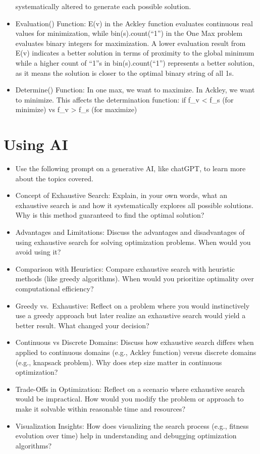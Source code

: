 \documentclass[
  letterpaper,
  DIV=11,
  numbers=noendperiod]{scrreprt}
\providecommand{\tightlist}{%
  \setlength{\itemsep}{0pt}\setlength{\parskip}{0pt}}\usepackage{longtable,booktabs,array}
\begin{document}
\begin{itemize}
  systematically altered to generate each possible solution.
\item
  Evaluation() Function: E(v) in the Ackley function evaluates
  continuous real values for minimization, while bin(s).count(``1'') in
  the One Max problem evaluates binary integers for maximization. A
  lower evaluation result from E(v) indicates a better solution in terms
  of proximity to the global minimum while a higher count of ``1''s in
  bin(s).count(``1'') represents a better solution, as it means the
  solution is closer to the optimal binary string of all 1s.
\item
  Determine() Function: In one max, we want to maximize. In Ackley, we
  want to minimize. This affects the determination function: if f\_v
  \textless{} f\_s (for minimize) vs f\_v \textgreater{} f\_s (for
  maximize)
\end{itemize}


\chapter{Using AI}\label{using-ai-4}

\begin{itemize}
\tightlist
\item
  Use the following prompt on a generative AI, like chatGPT, to learn
  more about the topics covered.
\item
  Concept of Exhaustive Search: Explain, in your own words, what an
  exhaustive search is and how it systematically explores all possible
  solutions. Why is this method guaranteed to find the optimal solution?
\item
  Advantages and Limitations: Discuss the advantages and disadvantages
  of using exhaustive search for solving optimization problems. When
  would you avoid using it?
\item
  Comparison with Heuristics: Compare exhaustive search with heuristic
  methods (like greedy algorithms). When would you prioritize optimality
  over computational efficiency?
\item
  Greedy vs.~Exhaustive: Reflect on a problem where you would
  instinctively use a greedy approach but later realize an exhaustive
  search would yield a better result. What changed your decision?
\item
  Continuous vs Discrete Domains: Discuss how exhaustive search differs
  when applied to continuous domains (e.g., Ackley function) versus
  discrete domains (e.g., knapsack problem). Why does step size matter
  in continuous optimization?
\item
  Trade-Offs in Optimization: Reflect on a scenario where exhaustive
  search would be impractical. How would you modify the problem or
  approach to make it solvable within reasonable time and resources?
\item
  Visualization Insights: How does visualizing the search process (e.g.,
  fitness evolution over time) help in understanding and debugging
  optimization algorithms?
\end{itemize}
\end{document}
